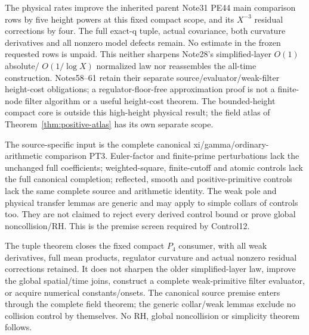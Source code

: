The physical rates improve the inherited parent Note31 PE44 main comparison rows by five height powers at this fixed compact scope, and its \(X^{-3}\) residual corrections by four. The full exact-q tuple, actual covariance, both curvature derivatives and all nonzero model defects remain. No estimate in the frozen requested rows is unpaid. This neither sharpens Note28's simplified-layer \(O(1)\) absolute/ \(O(1/\log X)\) normalized law nor reassembles the all-time construction. Notes58--61 retain their separate source/evaluator/weak-filter height-cost obligations; a regulator-floor-free approximation proof is not a finite-node filter algorithm or a useful height-cost theorem. The bounded-height compact core is outside this high-height physical result;
the field atlas of Theorem~\ref{thm:positive-atlas} has its own separate scope.

The source-specific input is the complete canonical xi/gamma/ordinary- arithmetic comparison PT3. Euler-factor and finite-prime perturbations lack the unchanged full coefficients; weighted-square, finite-cutoff and atomic controls lack the full canonical completion; reflected, smooth and positive-primitive controls lack the same complete source and arithmetic identity. The weak pole and physical transfer lemmas are generic and may apply to simple collars of controls too. They are not claimed to reject every derived control bound or prove global noncollision/RH. This is the premise screen required by Control12.


The tuple theorem closes the fixed compact $P_4$ consumer, with all
weak derivatives, full mean products, regulator curvature and actual
nonzero residual corrections retained. It does not sharpen the older
simplified-layer law, improve the global spatial/time joins, construct
a complete weak-primitive filter evaluator, or acquire numerical
constants/onsets. The canonical source premise enters through the
complete field theorem; the generic collar/weak lemmas exclude no
collision control by themselves. No RH, global noncollision or
simplicity theorem follows.
